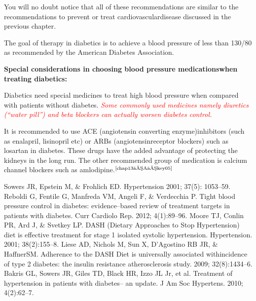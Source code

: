 You will no doubt notice that all of these recommendations are similar to the recommendations to prevent or treat cardiovascular\break disease discussed in the previous chapter.

The goal of therapy in diabetics is to achieve a blood pressure of less than 130/80 as recommended by the American Diabetes Association.

\noindent\textbf{Special considerations in choosing blood pressure medications\break when treating diabetics:}

Diabetics need special medicines to treat high blood pressure when compared with patients without diabetes. \textcolor{red}{\textit{Some commonly used medicines namely diuretics (“water pill”) and beta blockers can actually worsen diabetes control.}}

It is recommended to use ACE (angiotensin converting enzyme)\break inhibitors (such as enalapril, lisinopril etc) or ARBs (angiotensin\break receptor blockers) such as losartan in diabetes. These drugs have the added advantage of protecting the kidneys in the long run. The other recommended group of medication is calcium channel blockers such as amlodipine.$^{\text{\cite{chap13–A–key05}}}$

\begin{thebibliography}{99}
 Sowers JR, Epstein M, \& Frohlich ED. Hypertension 2001; 37(5): 1053–59.
 Reboldi G, Fentile G, Manfreda VM, Angeli F, \& Verdecchia P. Tight blood pressure control in diabetes: evidence–based review of treatment targets in patients with diabetes. Curr Cardiolo Rep. 2012; 4(1):89–96.
 Moore TJ, Conlin PR, Ard J, \& Svetkey LP. DASH (Dietary Approaches to Stop Hypertension) diet is effective treatment for stage 1 isolated systolic hypertension. Hypertension. 2001; 38(2):155–8.
 Liese AD, Nichols M, Sun X, D’Agostino RB JR, \& Haffner\break SM. Adherence to the DASH Diet is universally associated with\break incidence of type 2 diabetes: the insulin resistance atherosclerosis study. 2009; 32(8):1434–6.
 Bakris GL, Sowers JR, Giles TD, Black HR, Izzo JL Jr, et al. Treatment of hypertension in patients with diabetes– an update. J Am Soc Hypertens. 2010; 4(2):62–7.
\end{thebibliography}

\newpage
 
\setcounter{chapter}{12}
\renewcommand{\thechapter}{\arabic{chapter}B}
